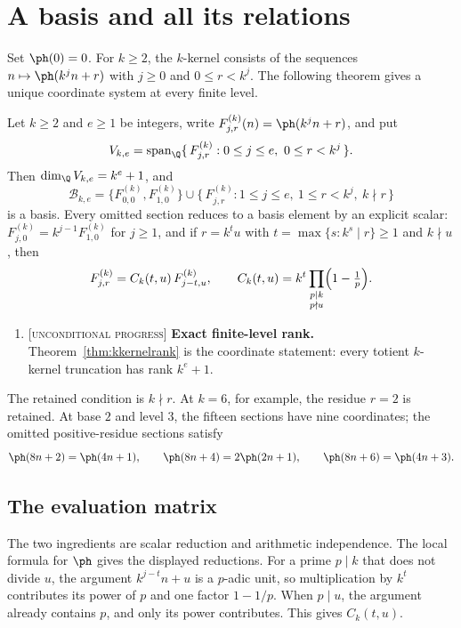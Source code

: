 \documentclass[11pt]{article}
\newcommand{\stag}[1]{{\normalfont\footnotesize\textsc{[#1]}}}
\begin{document}
\section{A basis and all its relations}\label{sec:results}
Set $\ph(0)=0$. For $k\ge2$, the $k$-kernel consists of the sequences
$n\mapsto\ph(k^jn+r)$ with $j\ge0$ and $0\le r<k^j$.
The following theorem gives a unique coordinate system at every finite level.
\begin{theorem}
\label{thm:kkernelrank}
Let $k\ge2$ and $e\ge1$ be integers, write $F^{(k)}_{j,r}(n)=\ph(k^jn+r)$, and put
\[
 V_{k,e}=\operatorname{span}_{\Q}
 \{\,F^{(k)}_{j,r}:0\le j\le e,\ 0\le r<k^j\,\}.
\]
Then $\dim_{\Q}V_{k,e}=k^e+1$, and
\[
 \mathcal B_{k,e}
 =\{F^{(k)}_{0,0},F^{(k)}_{1,0}\}
 \cup\{\,F^{(k)}_{j,r}:1\le j\le e,\ 1\le r<k^j,\ k\nmid r\,\}
\]
is a basis.  Every omitted section reduces to a basis element by an explicit
scalar: $F^{(k)}_{j,0}=k^{j-1}F^{(k)}_{1,0}$ for $j\ge1$, and if $r=k^tu$ with
$t=\max\{s:k^s\mid r\}\ge1$ and $k\nmid u$, then
\[
 F^{(k)}_{j,r}=C_k(t,u)\,F^{(k)}_{j-t,u},
 \qquad
 C_k(t,u)=k^t\prod_{\substack{p\mid k\\ p\nmid u}}\Bigl(1-\tfrac1p\Bigr).
\]
\end{theorem}
\begin{enumerate}
\item\label{res:rank} \stag{unconditional progress}
\textbf{Exact finite-level rank.}  Theorem~\ref{thm:kkernelrank} is the
coordinate statement: every totient $k$-kernel truncation has rank $k^e+1$.
\end{enumerate}
The retained condition is $k\nmid r$. At $k=6$, for example, the residue
$r=2$ is retained. At base $2$ and level $3$, the fifteen sections have nine
coordinates; the omitted positive-residue sections satisfy
\[
 \ph(8n+2)=\ph(4n+1),\qquad
 \ph(8n+4)=2\ph(2n+1),\qquad
 \ph(8n+6)=\ph(4n+3).
\]

\subsection{The evaluation matrix}\label{sec:rank}
The two ingredients are scalar reduction and arithmetic independence.
The local formula for $\ph$ gives the displayed reductions. For a prime
$p\mid k$ that does not divide $u$, the argument $k^{j-t}n+u$ is a $p$-adic
unit, so multiplication by $k^t$ contributes its power of $p$ and one factor
$1-1/p$. When $p\mid u$, the argument already contains $p$, and only its
power contributes. This gives $C_k(t,u)$.
\end{document}
